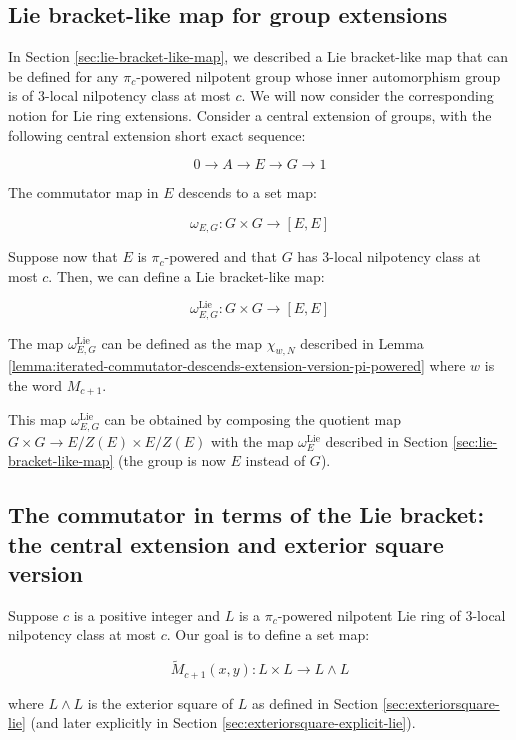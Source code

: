 \documentclass{ucetd}
\begin{document}
\subsection{Lie bracket-like map for group extensions}\label{sec:lie-bracket-like-map-for-extensions}

In Section \ref{sec:lie-bracket-like-map}, we described a Lie
bracket-like map that can be defined for any $\pi_c$-powered nilpotent
group whose inner automorphism group is of $3$-local nilpotency class
at most $c$. We will now consider the corresponding notion for Lie
ring extensions. Consider a central extension of groups, with the
following central extension short exact sequence:

$$0 \to A \to E \to G \to 1$$

The commutator map in $E$ descends to a set map:

$$\omega_{E,G}: G \times G \to [E,E]$$

Suppose now that $E$ is $\pi_c$-powered and that $G$ has $3$-local
nilpotency class at most $c$. Then, we can define a Lie bracket-like
map:

$$\omega_{E,G}^{\text{Lie}}: G \times G \to [E,E]$$

The map $\omega_{E,G}^{\text{Lie}}$ can be defined as the map
$\chi_{w,N}$ described in Lemma
\ref{lemma:iterated-commutator-descends-extension-version-pi-powered}
where $w$ is the word $M_{c+1}$.

This map $\omega_{E,G}^{\text{Lie}}$ can be obtained by composing the
quotient map $G \times G \to E/Z(E) \times E/Z(E)$ with the map
$\omega_E^{\text{Lie}}$ described in Section
\ref{sec:lie-bracket-like-map} (the group is now $E$ instead of $G$).

\subsection{The commutator in terms of the Lie bracket: the central extension and exterior square version}\label{sec:group-commutator-ito-lie-bracket-exteriorsquare-version}

Suppose $c$ is a positive integer and $L$ is a $\pi_c$-powered
nilpotent Lie ring of $3$-local nilpotency class at most $c$. Our goal
is to define a set map:

$$\tilde{M}_{c+1}(x,y): L \times L \to L \wedge L$$

where $L \wedge L$ is the exterior square of $L$ as defined in Section
\ref{sec:exteriorsquare-lie} (and later explicitly in Section
\ref{sec:exteriorsquare-explicit-lie}).
\end{document}
